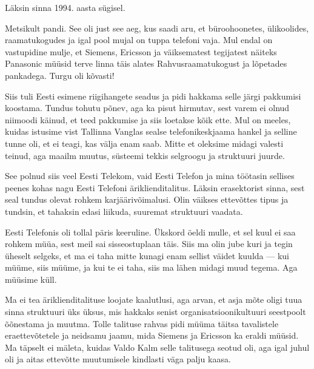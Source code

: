 Läksin sinna 1994. aasta sügisel. 


Metsikult pandi. See oli just see aeg, kus saadi aru, et büroohoonetes, 
ülikoolides, raamatukogudes ja igal pool mujal on tuppa telefoni vaja. 
Mul endal on vastupidine mulje, et Siemens, Ericsson ja 
väiksematest tegijatest näiteks Panasonic 
müüsid terve linna täis alates Rahvusraamatukogust ja lõpetades 
pankadega. Turgu oli kõvasti! 

Siis tuli Eesti esimene riigihangete seadus ja
pidi hakkama selle järgi pakkumisi koostama. Tundus tohutu põnev, aga ka pisut 
hirmutav, sest varem ei olnud niimoodi käinud, et teed pakkumise ja siis 
loetakse kõik ette. Mul on meeles, kuidas istusime vist Tallinna Vanglas sealse  
telefonikeskjaama hankel ja selline tunne oli, et ei teagi, kas välja enam 
saab. Mitte et oleksime midagi valesti teinud, 
aga maailm muutus, süsteemi tekkis selgroogu ja struktuuri 
juurde.


See polnud siis veel Eesti Telekom, vaid Eesti Telefon ja 
mina töötasin sellises peenes kohas nagu Eesti Telefoni äriklienditalitus. Läksin erasektorist sinna, sest seal tundus 
olevat rohkem karjäärivõimalusi. Olin väikses ettevõttes tipus ja tundsin, et 
tahaksin edasi liikuda, suuremat struktuuri vaadata. 

Eesti Telefonis oli tollal päris keeruline. Ükskord öeldi mulle, et sel kuul ei saa rohkem müüa, sest meil sai 
sisseostuplaan täis. Siis ma olin jube kuri ja tegin üheselt selgeks, et ma ei 
taha mitte kunagi enam sellist väidet kuulda --- kui müüme, siis müüme, ja 
kui te ei taha, siis ma lähen midagi muud tegema. Aga müüsime küll.


Ma ei tea äriklienditalituse loojate kaalutlusi, aga arvan, et asja 
mõte oligi tuua sinna struktuuri üks üksus, mis hakkaks senist organisatsioonikultuuri seestpoolt õõnestama ja muutma. 
Tolle talituse rahvas pidi müüma täitsa tavalistele eraettevõtetele ja 
 neidsamu jaamu, mida Siemens ja Ericsson ka eraldi müüsid. Ma täpselt ei mäleta, kuidas Valdo Kalm selle 
talitusega seotud oli, aga igal juhul oli ja aitas
ettevõtte muutumisele kindlasti väga palju kaasa. 

